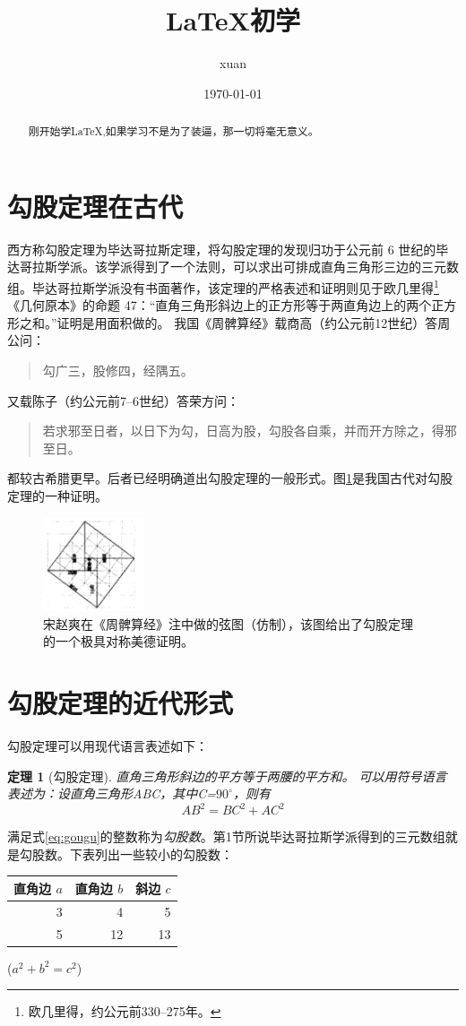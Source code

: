 \documentclass[UTF8]{ctexart}
\title{\heiti \LaTeX 初学}
\author{\kaishu xuan}
\date{\today}
\newtheorem{thm}{定理}
\begin{document}
\maketitle
\newenvironment{myquote}{\begin{quote}\kaishu\zihao{-5}}{\end{quote}}
\newcommand{\degree}{^\circ}


\begin{abstract}
刚开始学\LaTeX,如果学习不是为了装逼，那一切将毫无意义。
\end{abstract}
\tableofcontents
\section{勾股定理在古代}
西方称勾股定理为毕达哥拉斯定理，将勾股定理的发现归功于公元前 6 世纪的毕达哥拉斯学派\cite{Kline}。该学派得到了一个法则，可以求出可排成直角三角形三边的三元数组。毕达哥拉斯学派没有书面著作，该定理的严格表述和证明则见于欧几里得\footnote{欧几里得，约公元前330--275年。}《几何原本》的命题 47：“直角三角形斜边上的正方形等于两直角边上的两个正方形之和。”证明是用面积做的。
我国《周髀算经》载商高（约公元前12世纪）答周公问：
\begin{myquote}
勾广三，股修四，经隅五。
\end{myquote}
又载陈子（约公元前7--6世纪）答荣方问：
\begin{myquote}
若求邪至日者，以日下为勾，日高为股，勾股各自乘，并而开方除之，得邪至日。
\end{myquote}
都较古希腊更早。后者已经明确道出勾股定理的一般形式。图\ref{fig:gougu}是我国古代对勾股定理的一种证明\cite{quanjing}。 
\begin{figure}[ht]
  \centering
  \includegraphics[width=3cm]{gougu.png}
  \caption {\kaishu{} 宋赵爽在《周髀算经》注中做的弦图（仿制），该图给出了勾股定理的一个极具对称美德证明。}
  \label{fig:gougu}
\end{figure}


\section{勾股定理的近代形式}
勾股定理可以用现代语言表述如下：
\begin{thm}[勾股定理]
直角三角形斜边的平方等于两腰的平方和。
可以用符号语言表述为：设直角三角形ABC，其中\angle C=$90\degree$，则有
\begin{equation} \label{eq:gougu}
AB^2 = BC^2 + AC^2
\end{equation}
\end{thm}

满足式\eqref{eq:gougu}的整数称为\emph{勾股数}。第1节所说毕达哥拉斯学派得到的三元数组就是勾股数。下表列出一些较小的勾股数：
\begin{table}[h]
\begin{tabular}{|rrr|}
\hline
直角边 $a$ & 直角边 $b$ & 斜边 $c$\\
\hline
3 &  4 & 5\\
5 &  12&  13\\
\hline
\end{tabular}%
\qquad
($a^2 + b^2 = c^2$)
\end{table}
\nocite{Shiye}

\end{document}
